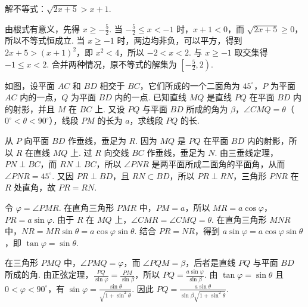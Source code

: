 \documentclass[UTF8,a4paper,oneside,11pt]{ctexbook}
\begin{document}
\begin{problem}

解不等式：\(\sqrt{2x+5}>x+1\).

\begin{solution}
由根式有意义，先得 \(x\geqslant-\frac{5}{2}\). 当 \(-\frac{5}{2}\leqslant x<-1\) 时，\(x+1<0\)，而 \(\sqrt{2x+5}\geqslant0\)，所以不等式恒成立. 当 \(x\geqslant-1\) 时，两边均非负，可以平方，得到 \(2x+5>(x+1)^2\)，即 \(x^2<4\)，所以 \(-2<x<2\). 与 \(x\geqslant-1\) 取交集得 \(-1\leqslant x<2\). 合并两种情况，原不等式的解集为 \(\left[-\frac{5}{2},2\right)\).
\end{solution}
\end{problem}

\begin{problem}

如图，设平面 \(AC\) 和 \(BD\) 相交于 \(BC\)，它们所成的一个二面角为 \(45^{\circ}\)，\(P\) 为平面 \(AC\) 内的一点，\(Q\) 为平面 \(BD\) 内的一点. 已知直线 \(MQ\) 是直线 \(PQ\) 在平面 \(BD\) 内的射影，并且 \(M\) 在 \(BC\) 上. 又设 \(PQ\) 与平面 \(BD\) 所成的角为 \(\beta\)，\(\angle CMQ=\theta\)（\(0^{\circ}<\theta<90^{\circ}\)），线段 \(PM\) 的长为 \(a\)，求线段 \(PQ\) 的长.


\begin{solution}
从 \(P\) 向平面 \(BD\) 作垂线，垂足为 \(R\). 因为 \(MQ\) 是 \(PQ\) 在平面 \(BD\) 内的射影，所以 \(R\) 在直线 \(MQ\) 上. 过 \(R\) 向交线 \(BC\) 作垂线，垂足为 \(N\). 由三垂线定理，\(PN\perp BC\)，而 \(RN\perp BC\)，所以 \(\angle PNR\) 是两平面所成二面角的平面角，从而 \(\angle PNR=45^{\circ}\). 又因 \(PR\perp BD\)，且 \(RN\subset BD\)，所以 \(PR\perp RN\)，三角形 \(PNR\) 在 \(R\) 处直角，故 \(PR=RN\).

令 \(\varphi=\angle PMR\). 在直角三角形 \(PMR\) 中，\(PM=a\)，所以 \(MR=a\cos\varphi\)，\(PR=a\sin\varphi\). 由于 \(R\) 在 \(MQ\) 上，\(\angle CMR=\angle CMQ=\theta\). 在直角三角形 \(MNR\) 中，\(NR=MR\sin\theta=a\cos\varphi\sin\theta\). 结合 \(PR=NR\)，得到 \(a\sin\varphi=a\cos\varphi\sin\theta\)，即 \(\tan\varphi=\sin\theta\).

在三角形 \(PMQ\) 中，\(\angle PMQ=\varphi\)，而 \(\angle PQM=\beta\)，后者是直线 \(PQ\) 与平面 \(BD\) 所成的角. 由正弦定理，\(\frac{PQ}{\sin\varphi}=\frac{PM}{\sin\beta}\)，所以 \(PQ=\frac{a\sin\varphi}{\sin\beta}\). 由 \(\tan\varphi=\sin\theta\) 且 \(0<\varphi<90^{\circ}\)，有 \(\sin\varphi=\frac{\sin\theta}{\sqrt{1+\sin^2\theta}}\). 因此 \(PQ=\frac{a\sin\theta}{\sin\beta\sqrt{1+\sin^2\theta}}\).
\end{solution}
\end{problem}
\end{document}
